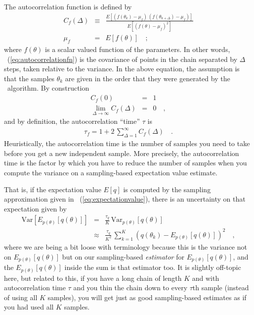 \documentclass[modern]{aastex61}
\newcommand{\MCMC}{\acronym{MCMC}}
\newcommand{\Var}{\mathrm{Var}}
\newcommand{\pars}{\theta}
\begin{document}
The autocorrelation function is defined by
\begin{eqnarray}
C_f(\Delta) &\equiv& \frac{E[(f(\pars_k)-\mu_f)\,(f(\pars_{k+\Delta})-\mu_f)]}
                          {E[(f(\pars)-\mu_f)^2]}
\label{eq:autocorrelationfn}\\
\mu_f &=& E[f(\pars)]
\quad ;
\end{eqnarray}
where $f(\pars)$ is a scalar valued function of the parameters.
In other words, \equationname~(\ref{eq:autocorrelationfn}) is the covariance
of points in the chain separated by $\Delta$ steps, taken relative to the
variance.
In the above equation, the assumption is that the samples $\pars_k$ are
given in the order that they were generated by the \MCMC\ algorithm.
By construction
\begin{eqnarray}
C_f(0) &=& 1
\\
\lim_{\Delta\rightarrow\infty} C_f(\Delta) &=& 0
\quad ,
\end{eqnarray}
and by definition, the autocorrelation ``time'' $\tau$ is
\begin{eqnarray}
\tau_f = 1 + 2\,\sum_{\Delta = 1}^{\infty} C_f(\Delta)
\label{eq:autocorrelationtime}\quad.
\end{eqnarray}
Heuristically, the autocorrelation time is the number of samples you
need to take before you get a new independent sample.
More precisely, the autocorrelation time is the factor by which you
have to reduce the number of samples when you compute the variance on
a sampling-based expectation value estimate.

That is, if the expectation value $E[q]$ is computed by the sampling
approximation given in \equationname~(\ref{eq:expectationvalue}),
there is an uncertainty on that expectation given by
\begin{eqnarray}
  \Var[E_{p(\pars)}[q(\pars)]] &=& \frac{\tau_q}{K}\,\Var_{p(\pars)}[q(\pars)]
  \\
  &\approx& \frac{\tau_q}{K^2}\,\sum_{k=1}^K \left(q(\pars_k) -
    E_{p(\pars)}[q(\pars)]\right)^2
  \quad,
\label{eq:tauvar}
\end{eqnarray}
where we are being a bit loose with terminology because this is the
variance not on $E_{p(\pars)}[q(\pars)]$ but on our sampling-based
\emph{estimator} for
$E_{p(\pars)}[q(\pars)]$, and the $E_{p(\pars)}[q(\pars)]$ inside the sum is
that estimator too.
It is slightly off-topic here, but related to this, if you have a long
chain of length $K$ and with autocorrelation time $\tau$ and you thin
the chain down to every $\tau$th sample (instead of using all $K$
samples), you will get just as good sampling-based estimates as if you
had used all $K$ samples.
\end{document}
